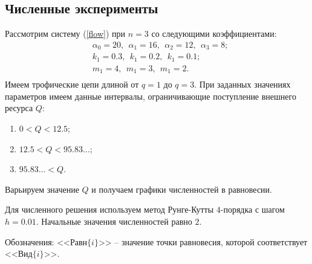 \subsection{Численные эксперименты}
    Рассмотрим систему (\ref{flow}) при \(n=3\) со следующими коэффициентами:
    \begin{equation*}
        \begin{split}
            & \alpha_0 = 20, ~~ \alpha_1 = 16, ~~ \alpha_2 = 12, ~~ \alpha_3 = 8; \\
            & k_1 = 0.3, ~~ k_1 = 0.2, ~~ k_1 = 0.1; \\
            & m_1 = 4, ~~ m_1 = 3, ~~ m_1 = 2. \\ 
        \end{split}
    \end{equation*}
    Имеем трофические цепи длиной от \(q=1\) до \(q=3\). При заданных значениях параметров имеем данные интервалы, ограничивающие поступление внешнего ресурса \(Q\):
    \begin{enumerate}
        \item \(0 < Q < 12.5\);
        \item \(12.5 < Q < 95.83\dots\);
        \item \( 95.83\ldots < Q\).
    \end{enumerate}
    Варьируем значение \(Q\) и получаем графики численностей в равновесии.

    Для численного решения используем метод Рунге-Кутты \(4\)-порядка с шагом \(h = 0.01\). Начальные значения численностей равно \(2\). 
    
    Обозначения: <<Равн\(\{i\}\)>> -- значение точки равновесия, которой соответствует <<Вид\(\{i\}\)>>.

